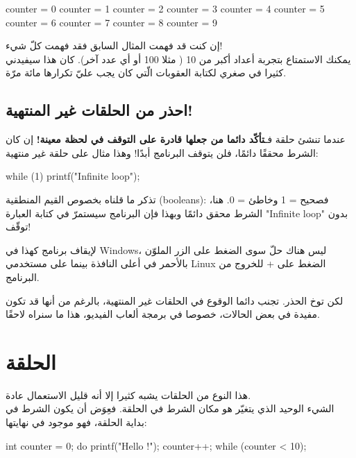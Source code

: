 \begin{Console}
counter = 0
counter = 1
counter = 2
counter = 3
counter = 4
counter = 5
counter = 6
counter = 7
counter = 8
counter = 9
\end{Console}

إن كنت قد فهمت المثال السابق فقد فهمت كلّ شيء!\\
يمكنك الاستمتاع بتجربة أعداد أكبر من 10 ( مثلا 100 أو أي عدد آخر). كان هذا سيفيدني كثيرا في صغري لكتابة العقوبات الّتي كان يجب عليّ تكرارها مائة مرّة.

\subsection{احذر من الحلقات غير المنتهية! }

عندما تنشئ حلقة فـ\textbf{تأكّد دائما من جعلها قادرة على التوقف في لحظة معينة!}
إن كان الشرط محققًا دائمًا، فلن يتوقف البرنامج أبدًا! وهذا مثال على حلقة غير منتهية:

\begin{Csource}
while (1)
{
	printf("Infinite loop\n");
}
\end{Csource}

تذكر ما قلناه بخصوص القيم المنطقية 
(\textenglish{booleans}):
فصحيح = 1 وخاطئ = 0. هنا، الشرط محقق دائمًا وبهذا فإن البرنامج سيستمرّ في كتابة العبارة 
"\textenglish{Infinite loop}"
بدون توقّف!

\begin{information}
لإيقاف برنامج كهذا في \textenglish{Windows}، ليس هناك حلّ سوى الضغط على الزر 
الملوّن بالأحمر في أعلى النافذة بينما على مستخدمي \textenglish{Linux} الضغط على
 + 
للخروج من البرنامج.
\end{information}
\textbf{\textbf{\textbf{}}}
لكن توخ الحذر. تجنب دائما الوقوع في الحلقات غير المنتهية، بالرغم من أنها قد تكون مفيدة في بعض الحالات، خصوصا في برمجة ألعاب الفيديو، هذا ما سنراه لاحقًا.

\section{الحلقة }

هذا النوع من الحلقات يشبه كثيرا 
إلا أنه قليل الاستعمال عادة.\\
الشيء الوحيد الذي يتغيّر هو مكان الشرط في الحلقة. فعِوَض أن يكون الشرط في بداية الحلقة، فهو موجود في نهايتها:

\begin{Csource}
int counter = 0;
do
{
	printf("Hello !\n");
	counter++;
} while (counter < 10);
\end{Csource}

